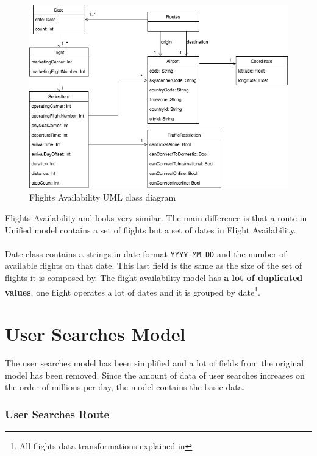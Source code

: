 \begin{figure}[H]
\centering
\includegraphics[scale=0.6]{diagrams/flights_availability_model.png}
\caption{Flights Availability UML class diagram}
\end{figure}

Flights Availability and  looks very similar. The main difference is that a route in Unified model contains a set of flights but a set of dates in Flight Availability.
\\\\
Date class contains a strings in date format \texttt{YYYY-MM-DD} and the number of available flights on that date. This last field is the same as the size of the set of flights it is composed by. The flight availability model has \textbf{a lot of duplicated values}, one flight operates a lot of dates and it is grouped by date\footnote{All flights data transformations explained in }.


\section{User Searches Model}

The user searches model has been simplified and a lot of fields from the original model has been removed. Since the amount of data of user searches increases on the order of millions per day, the model contains the basic data.

\subsubsection*{User Searches Route}

